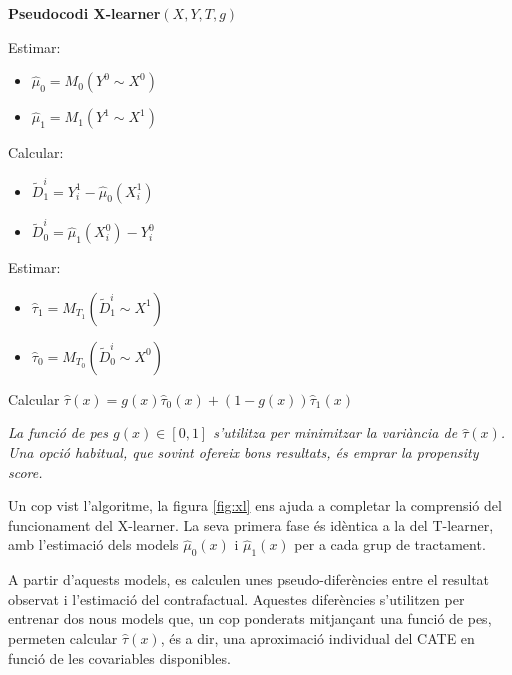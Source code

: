 \documentclass[../main.tex]{subfiles}
\begin{document}
    \begin{table}[H]
        \begin{minipage}{\linewidth}
            \begin{algorithm}[H]
            \caption{\textbf{Pseudocodi X-learner}$(X,Y,T,g)$}
            \begin{algorithmic}[1]
                \State Estimar: 
                    \begin{itemize}
                        \item[] $\hat\mu_0 = M_0(Y^0 \sim X^0)$
                        \item[] $\hat\mu_1 = M_1(Y^1 \sim X^1)$
                    \end{itemize}
                    
                \State Calcular:
                  \begin{itemize}
                    \item[] $\tilde{D}_1^i = Y_i^1 - \hat\mu_0(X_i^1)$
                    \item[] $\tilde{D}_0^i = \hat\mu_1(X_i^0) - Y_i^0$
                  \end{itemize}
                  
                \State Estimar:
                  \begin{itemize}
                    \item[] $\hat{\tau}_1 = M_{T_1}(\tilde{D}_1^i \sim X^1)$
                    \item[] $\hat{\tau}_0 = M_{T_0}(\tilde{D}_0^i \sim X^0)$
                  \end{itemize}
                  
                \State Calcular $\hat{\tau}(x) = g(x)\hat{\tau}_0(x) + (1 - g(x))\hat{\tau}_1(x)$
            \end{algorithmic}
            \end{algorithm}
            \vspace{-3ex}
            {\scriptsize\textit{La funció de pes $g(x) \in [0,1]$ s’utilitza per minimitzar la variància de $\hat{\tau}(x)$. Una opció habitual, que sovint ofereix bons resultats, és emprar la propensity score.}}
        \end{minipage}
    \end{table}

    Un cop vist l’algoritme, la figura \ref{fig:xl} ens ajuda a completar la comprensió del funcionament del X-learner. La seva primera fase és idèntica a la del T-learner, amb l’estimació dels models $\hat{\mu}_0(x)$ i $\hat{\mu}_1(x)$ per a cada grup de tractament.\par
    A partir d’aquests models, es calculen unes pseudo-diferències entre el resultat observat i l’estimació del contrafactual. Aquestes diferències s’utilitzen per entrenar dos nous models que, un cop ponderats mitjançant una funció de pes, permeten calcular $\hat{\tau}(x)$, és a dir, una aproximació individual del CATE en funció de les covariables disponibles.
    
\end{document}
